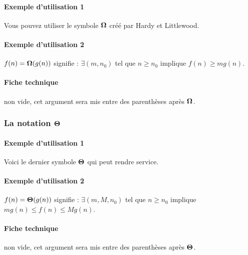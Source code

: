 \documentclass[12pt,a4paper]{article}
\begin{document}
            \paragraph{Exemple d'utilisation 1}

\begin{tcblisting}{}
Vous pouvez utiliser le symbole $\bigomega{}$ créé par Hardy et Littlewood.
\end{tcblisting}


            \paragraph{Exemple d'utilisation 2}

\begin{tcblisting}{}
$f(n) = \bigomega{g(n)}$ signifie :
$\exists (m, n_0)$ tel que $n \geqslant n_0$ implique $f(n) \geqslant m g(n)$.
\end{tcblisting}


            \paragraph{Fiche technique}


\IDarg{} non vide, cet argument sera mis entre des parenthèses après $\bigomega{}$.



        \subsubsection{\texorpdfstring{La notation $\bigtheta{}$}%
                               {La notation "grand Theta"}}

            \paragraph{Exemple d'utilisation 1}

\begin{tcblisting}{}
Voici le dernier symbole $\bigtheta{}$ qui peut rendre service.
\end{tcblisting}


            \paragraph{Exemple d'utilisation 2}

\begin{tcblisting}{}
$f(n) = \bigtheta{g(n)}$ signifie : $\exists (m, M, n_0)$ tel que $n \geqslant n_0$
implique $m g(n) \leqslant f(n) \leqslant M g(n)$.
\end{tcblisting}


            \paragraph{Fiche technique}


\IDarg{} non vide, cet argument sera mis entre des parenthèses après $\bigtheta{}$.
\end{document}
